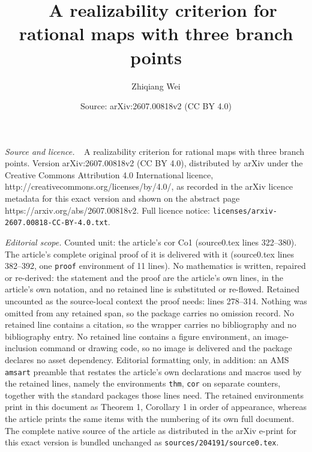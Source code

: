 \documentclass[10pt,a4paper]{amsart}
\title{$\ \ $ A realizability criterion for rational maps with three branch points}
\author{Zhiqiang Wei}
\date{Source: arXiv:2607.00818v2 (CC BY 4.0)}
\begin{document}
\maketitle

\noindent\emph{Source and licence.} $\ \ $ A realizability criterion for rational maps with three branch points. Version arXiv:2607.00818v2 (CC BY 4.0), distributed by arXiv under the Creative Commons Attribution 4.0 International licence, http://creativecommons.org/licenses/by/4.0/, as recorded in the arXiv licence metadata for this exact version and shown on the abstract page https://arxiv.org/abs/2607.00818v2. Full licence notice: \texttt{licenses/arxiv-2607.00818-CC-BY-4.0.txt}.\par\smallskip

\noindent\textit{Editorial scope.} Counted unit: the article's cor Co1 (source0.tex lines 322--380). The article's complete original proof of it is delivered with it (source0.tex lines 382--392, one \texttt{proof} environment of 11 lines). No mathematics is written, repaired or re-derived: the statement and the proof are the article's own lines, in the article's own notation, and no retained line is substituted or re-flowed.  Retained uncounted as the source-local context the proof needs: lines 278--314.  Nothing was omitted from any retained span, so the package carries no omission record.  No retained line contains a citation, so the wrapper carries no bibliography and no bibliography entry.  No retained line contains a figure environment, an image-inclusion command or drawing code, so no image is delivered and the package declares no asset dependency.  Editorial formatting only, in addition: an AMS \texttt{amsart} preamble that restates the article's own declarations and macros used by the retained lines, namely the environments \texttt{thm}, \texttt{cor} on separate counters, together with the standard packages those lines need.  The retained environments print in this document as Theorem 1, Corollary 1 in order of appearance, whereas the article prints the same items with the numbering of its own full document.  The complete native source of the article as distributed in the arXiv e-print for this exact version is bundled unchanged as \texttt{sources/204191/source0.tex}.
\end{document}
